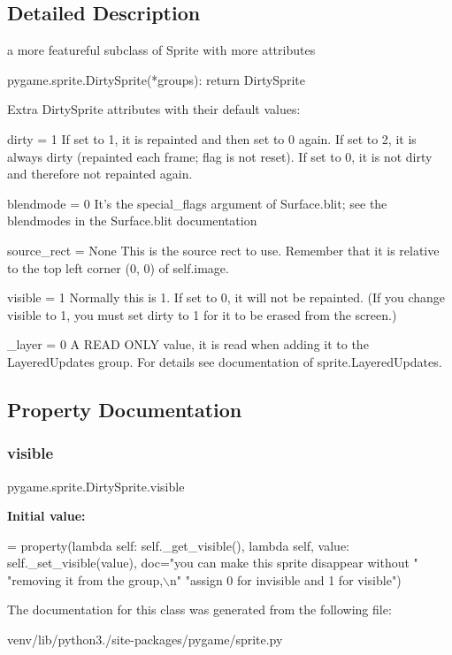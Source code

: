 \subsection{Detailed Description}
\begin{DoxyVerb}a more featureful subclass of Sprite with more attributes

pygame.sprite.DirtySprite(*groups): return DirtySprite

Extra DirtySprite attributes with their default values:

dirty = 1
    If set to 1, it is repainted and then set to 0 again.
    If set to 2, it is always dirty (repainted each frame;
    flag is not reset).
    If set to 0, it is not dirty and therefore not repainted again.

blendmode = 0
    It's the special_flags argument of Surface.blit; see the blendmodes in
    the Surface.blit documentation

source_rect = None
    This is the source rect to use. Remember that it is relative to the top
    left corner (0, 0) of self.image.

visible = 1
    Normally this is 1. If set to 0, it will not be repainted. (If you
    change visible to 1, you must set dirty to 1 for it to be erased from
    the screen.)

_layer = 0
    A READ ONLY value, it is read when adding it to the LayeredUpdates
    group. For details see documentation of sprite.LayeredUpdates.\end{DoxyVerb}
 

\subsection{Property Documentation}
\mbox{\label{classpygame_1_1sprite_1_1_dirty_sprite_aeb99f24b7a00b24928130e04a4e5e5b2}} 
\subsubsection{\texorpdfstring{visible}{visible}}
{\footnotesize\ttfamily pygame.\+sprite.\+Dirty\+Sprite.\+visible\hspace{0.3cm}{\ttfamily [static]}}

{\bfseries Initial value\+:}
\begin{DoxyCode}
=  property(\textcolor{keyword}{lambda} self: self.\_get\_visible(),
                       \textcolor{keyword}{lambda} self, value: self.\_set\_visible(value),
                       doc=\textcolor{stringliteral}{"you can make this sprite disappear without "}
                           \textcolor{stringliteral}{"removing it from the group,\(\backslash\)n"}
                           \textcolor{stringliteral}{"assign 0 for invisible and 1 for visible"})
\end{DoxyCode}


The documentation for this class was generated from the following file\+:\begin{DoxyCompactItemize}
\item 
venv/lib/python3./site-\/packages/pygame/sprite.\+py\end{DoxyCompactItemize}
